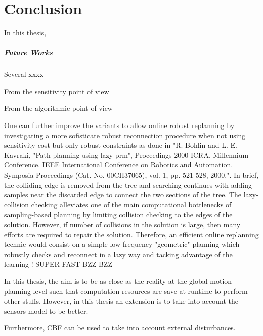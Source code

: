\chapter{Conclusion}\label{chap:concl}

\glsresetall

In this thesis, 

\paragraph{Future Works} Several xxxx 


From the sensitivity point of view 

From the algorithmic point of view 


One can further improve the  variants to allow online robust replanning by investigating a more sofisticate robust reconnection procedure when not using sensitivity cost but only robust constraints as done in "R. Bohlin and L. E. Kavraki, "Path planning using lazy prm", Proceedings 2000 ICRA. Millennium Conference. IEEE International Conference on Robotics and Automation. Symposia Proceedings (Cat. No. 00CH37065), vol. 1, pp. 521-528, 2000.".
In brief, the colliding edge is removed from the tree and searching continues with adding samples near the discarded edge to connect the two sections of the tree. The lazy-collision checking alleviates one of the main computational bottlenecks of sampling-based planning by limiting collision checking to the edges of the solution. 
However, if number of collisions in the solution is large, then many efforts are required to repair the solution. 
Therefore, an efficient online replanning technic would consist on a simple low frequency "geometric" planning which robustly checks and reconnect in a lazy way and tacking advantage of the learning ! SUPER FAST BZZ BZZ 

In this thesis, the aim is to be as close as the reality at the global motion planning level such that computation resources are save at runtime to perform other stuffs.
However, in this thesis an extension is to take into account the sensors model to be better.

Furthermore, CBF can be used to take into account external disturbances.